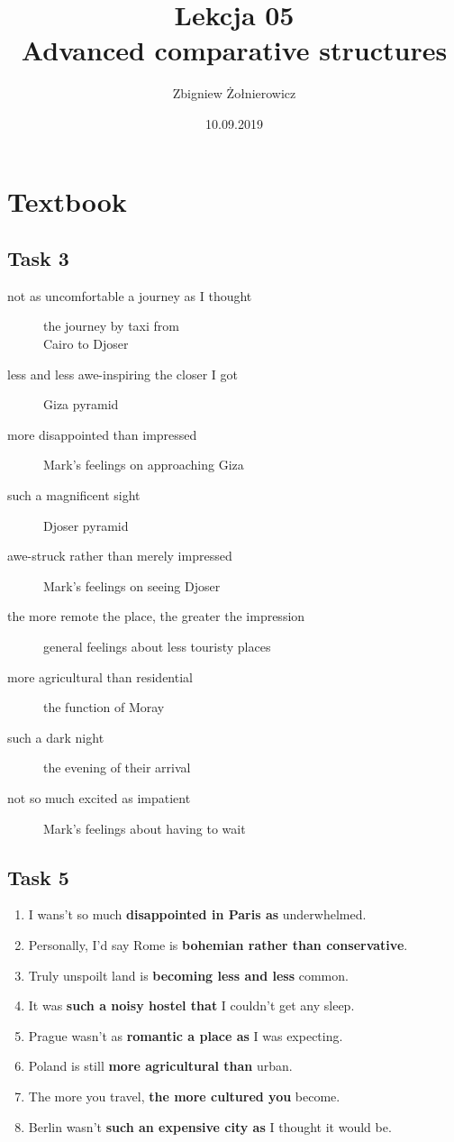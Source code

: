 \documentclass[a4paper]{article}
\begin{document}
\title{{\huge Lekcja 05} \\
{\large Advanced comparative structures}}
\author{Zbigniew Żołnierowicz}
\date{10.09.2019}
\maketitle
\section*{Textbook}
\subsection{Task 3}
\begin{description}
    \item[not as uncomfortable a journey as I thought] the journey by taxi from \\
    Cairo to Djoser
    \item[less and less awe-inspiring the closer I got] Giza pyramid
    \item[more disappointed than impressed] Mark's feelings on approaching Giza
    \item[such a magnificent sight] Djoser pyramid
    \item[awe-struck rather than merely impressed] Mark's feelings on seeing Djoser 
    \item[the more remote the place, the greater the impression] general feelings about less touristy places
    \item[more agricultural than residential] the function of Moray
    \item[such a dark night] the evening of their arrival
    \item[not so much excited as impatient] Mark's feelings about having to wait
\end{description}
\subsection{Task 5}
\begin{enumerate}
    \item I wans't so much \textbf{disappointed in Paris as} underwhelmed.
    \item Personally, I'd say Rome is \textbf{bohemian rather than conservative}.
    \item Truly unspoilt land is \textbf{becoming less and less} common.
    \item It was \textbf{such a noisy hostel that} I couldn't get any sleep.
    \item Prague wasn't as \textbf{romantic a place as} I was expecting.
    \item Poland is still \textbf{more agricultural than} urban.
    \item The more you travel, \textbf{the more cultured you} become.
    \item Berlin wasn't \textbf{such an expensive city as} I thought it would be.
\end{enumerate}
\end{document}
